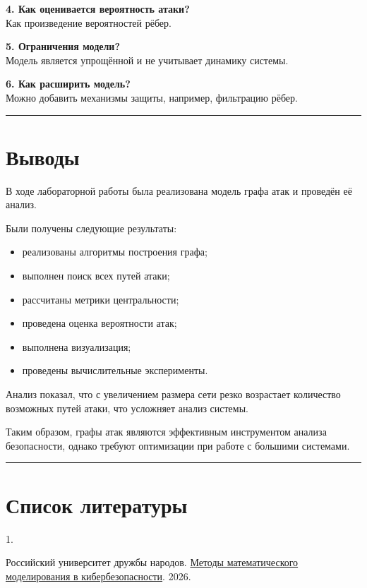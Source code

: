 \documentclass[
  english,
  russian,
  12pt,
  a4paper,
  DIV=11,
  numbers=noendperiod]{scrreprt}
\newlength{\cslhangindent}
\newlength{\csllabelwidth}
\newenvironment{CSLReferences}[2] %
 {\begin{list}{}{%
  \setlength{\itemindent}{0pt}
  \setlength{\leftmargin}{0pt}
  \setlength{\parsep}{0pt}
  \ifodd #1
   \setlength{\leftmargin}{\cslhangindent}
   \setlength{\itemindent}{-1\cslhangindent}
  \fi
  \setlength{\itemsep}{#2\baselineskip}}}
 {\end{list}}
\newcommand{\CSLLeftMargin}[1]{\parbox[t]{\csllabelwidth}{\strut#1\strut}}
\newcommand{\CSLRightInline}[1]{\parbox[t]{\linewidth - \csllabelwidth}{\strut#1\strut}}
\providecommand{\tightlist}{%
  \setlength{\itemsep}{0pt}\setlength{\parskip}{0pt}}
\begin{document}
\textbf{4. Как оценивается вероятность атаки?}\\
Как произведение вероятностей рёбер.

\textbf{5. Ограничения модели?}\\
Модель является упрощённой и не учитывает динамику системы.

\textbf{6. Как расширить модель?}\\
Можно добавить механизмы защиты, например, фильтрацию рёбер.

\begin{center}\rule{0.5\linewidth}{0.5pt}\end{center}

\chapter{Выводы}\label{ux432ux44bux432ux43eux434ux44b}

В ходе лабораторной работы была реализована модель графа атак и проведён
её анализ.

Были получены следующие результаты:

\begin{itemize}
\tightlist
\item
  реализованы алгоритмы построения графа;
\item
  выполнен поиск всех путей атаки;
\item
  рассчитаны метрики центральности;
\item
  проведена оценка вероятности атак;
\item
  выполнена визуализация;
\item
  проведены вычислительные эксперименты.
\end{itemize}

Анализ показал, что с увеличением размера сети резко возрастает
количество возможных путей атаки, что усложняет анализ системы.

Таким образом, графы атак являются эффективным инструментом анализа
безопасности, однако требуют оптимизации при работе с большими
системами.

\begin{center}\rule{0.5\linewidth}{0.5pt}\end{center}

\chapter*{Список
литературы}\label{ux441ux43fux438ux441ux43eux43a-ux43bux438ux442ux435ux440ux430ux442ux443ux440ux44b}

\label{refs}
\begin{CSLReferences}{0}{0}
\CSLLeftMargin{1. }%
\CSLRightInline{Российский университет дружбы народов.
\href{https://esystem.rudn.ru/mod/resource/view.php?id=1359126}{{Методы
математического моделирования в кибербезопасности}}. 2026.}

\end{CSLReferences}
\end{document}
